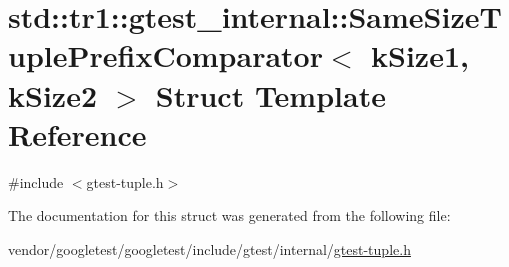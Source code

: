 \hypertarget{structstd_1_1tr1_1_1gtest__internal_1_1SameSizeTuplePrefixComparator}{}\section{std\+:\+:tr1\+:\+:gtest\+\_\+internal\+:\+:Same\+Size\+Tuple\+Prefix\+Comparator$<$ k\+Size1, k\+Size2 $>$ Struct Template Reference}
\label{structstd_1_1tr1_1_1gtest__internal_1_1SameSizeTuplePrefixComparator}


{\ttfamily \#include $<$gtest-\/tuple.\+h$>$}



The documentation for this struct was generated from the following file\+:\begin{DoxyCompactItemize}
\item 
vendor/googletest/googletest/include/gtest/internal/\hyperlink{gtest-tuple_8h}{gtest-\/tuple.\+h}\end{DoxyCompactItemize}
